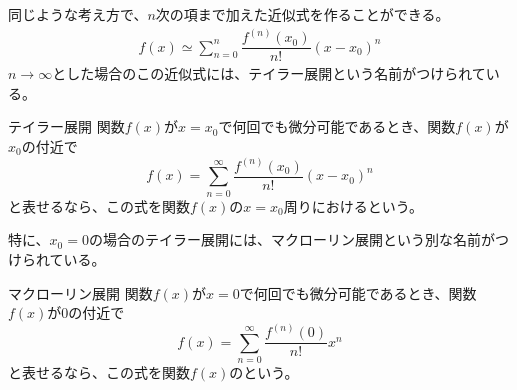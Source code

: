 \documentclass[../../../topic_calculus]{subfiles}
\begin{document}
同じような考え方で、$n$次の項まで加えた近似式を作ることができる。
\begin{align}
  f(x) \simeq \sum_{n=0}^{n} \dfrac{f^{(n)}(x_0)}{n!}(x-x_0)^n
\end{align}
$n \to \infty$とした場合のこの近似式には、テイラー展開という名前がつけられている。

\begin{theorem}{テイラー展開}\label{thm:taylor-expansion}
  関数$f(x)$が$x=x_0$で何回でも微分可能であるとき、関数$f(x)$が$x_0$の付近で
  \begin{equation}
    f(x) = \sum_{n=0}^{\infty} \dfrac{f^{(n)}(x_0)}{n!}(x-x_0)^n
  \end{equation}
  と表せるなら、この式を関数$f(x)$の$x=x_0$周りにおけるという。
\end{theorem}

特に、$x_0 = 0$の場合のテイラー展開には、マクローリン展開という別な名前がつけられている。

\begin{theorem}{マクローリン展開}
  関数$f(x)$が$x=0$で何回でも微分可能であるとき、関数$f(x)$が$0$の付近で
  \begin{equation}
    f(x) = \sum_{n=0}^{\infty} \dfrac{f^{(n)}(0)}{n!}x^n
  \end{equation}
  と表せるなら、この式を関数$f(x)$のという。
\end{theorem}
\end{document}
